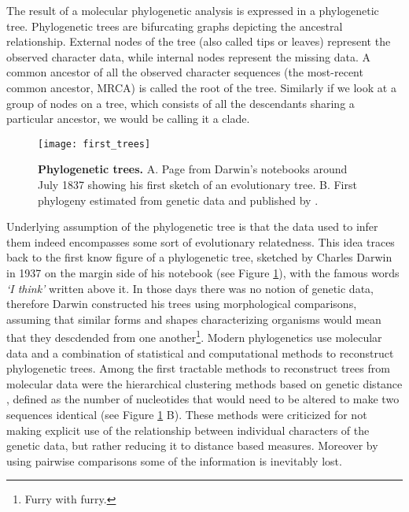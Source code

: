 The result of a molecular phylogenetic analysis is expressed in a phylogenetic tree. 
Phylogenetic trees are bifurcating graphs depicting the ancestral relationship.
External nodes of the tree (also called tips or leaves) represent the observed character data, while internal nodes represent the missing data.  
A common ancestor of all the observed character sequences (the most-recent common ancestor, MRCA) is called the root of the tree.
Similarly if we look at a group of nodes on a tree, which consists of all the descendants sharing a particular ancestor, we would be calling it a clade.

\begin{figure}[H]
\centering
\texttt{[image: first\_trees]} 
\caption{
{ \footnotesize 
{\bf Phylogenetic trees.} A. Page from Darwin's notebooks around July 1837 showing his first sketch of an evolutionary tree.
B. First phylogeny estimated from genetic data and published by \cite{Fitch1967}.
}%
}
\label{fig:first_trees}
\end{figure}

Underlying assumption of the phylogenetic tree is that the data used to infer them indeed encompasses some sort of evolutionary relatedness.
This idea traces back to the first know figure of a phylogenetic tree, sketched by Charles Darwin in 1937 on the margin side of his notebook (see Figure \ref{fig:first_trees}), with the famous words \emph{`I think'} written above it.
In those days there was no notion of genetic data, therefore Darwin constructed his trees using morphological comparisons, assuming that similar forms and shapes characterizing organisms would mean that they descdended from one another\footnote{Furry with furry.}.
Modern phylogenetics use molecular data and a combination of statistical and computational methods to reconstruct phylogenetic trees.
Among the first tractable methods to reconstruct trees from molecular data were the hierarchical clustering methods based on genetic distance \citep{Fitch1967}, defined as the number of nucleotides that would need to be altered to make two sequences identical (see Figure \ref{fig:first_trees} B).
These methods were criticized for not making explicit use of the relationship between individual characters of the genetic data, but rather reducing it to distance based measures.
Moreover by using pairwise comparisons some of the information is inevitably lost.

